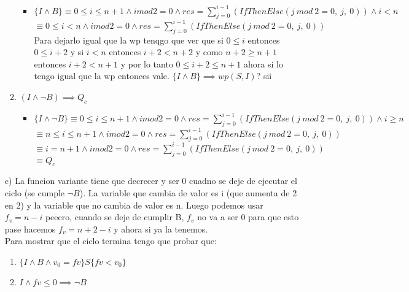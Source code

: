\documentclass{article}
\begin{document}
\begin{itemize}
\begin{enumerate}
\begin{itemize}
            \item $\{I \land B\} \equiv 0 \leq i \leq n + 1 \land i mod 2 = 0 \land res = \sum_{j=0}^{i-1} (IfThenElse(j\ mod\ 2 = 0,\ j,\ 0)) \land i < n$\\
            $\equiv 0 \leq i < n \land i mod 2 = 0 \land res = \sum_{j=0}^{i-1} (IfThenElse(j\ mod\ 2 = 0,\ j,\ 0))$ \\
            Para dejarlo igual que la wp tenqgo que ver que si $0 \leq i$ entonces $0 \leq i + 2$ y si $i < n$ entonces $i + 2 < n + 2$ y como $n + 2 \geq n + 1$ entonces $i + 2 < n + 1$ y por lo tanto $0 \leq i + 2 \leq n + 1$ ahora si lo tengo igual que la wp entonces vale. $\{I \land B\} \implies wp(S, I)$? sii \checkmark
        \end{itemize}
        \item $(I \land \lnot B) \implies Q_c$
        \begin{itemize}
            \item $\{I \land \lnot B\} \equiv 0 \leq i \leq n + 1 \land i mod 2 = 0 \land res = \sum_{j=0}^{i-1} (IfThenElse(j\ mod\ 2 = 0,\ j,\ 0)) \land i \geq n$\\
            $\equiv n \leq i \leq n + 1 \land i mod 2 = 0 \land res = \sum_{j=0}^{i-1} (IfThenElse(j\ mod\ 2 = 0,\ j,\ 0))$\\
            $\equiv i = n + 1 \land i mod 2 = 0 \land res = \sum_{j=0}^{i-1} (IfThenElse(j\ mod\ 2 = 0,\ j,\ 0))$\\
            $\equiv Q_c$ \checkmark
        \end{itemize}
    \end{enumerate}

    \item [c)] La funcion variante tiene que decrecer y ser 0 cuadno se deje de ejecutar el ciclo (se cumple $\lnot B$). La variable que cambia de valor es i (que aumenta de 2 en 2) y la variable que no cambia de valor es n. Luego podemos usar $f_v = n - i$ peeero, cuando se deje de cumplir B, $f_v$ no va a ser 0 para que esto pase hacemos $f_v = n + 2 - i$ y ahora si ya la tenemos.\\
    Para mostrar que el ciclo termina tengo que probar que:
    \begin{enumerate}
        \item $\{I \land B \land v_0 = fv\} S \{fv < v_0\}$
        \item $I \land fv \leq 0 \implies \lnot B$
    \end{enumerate}
\end{itemize}
\end{document}
